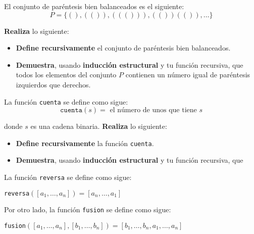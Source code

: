 \documentclass[oneside]{style}
\begin{document}
\begin{questions}[label=\protect\circled{\bfseries\arabic*}]
    \question
    {
        El conjunto de paréntesis bien balanceados es el siguiente:
        \begin{equation*}
            P = \{(), (()), ((())), (())(()), \ldots\}
        \end{equation*}

        \textbf{Realiza} lo siguiente:
        \begin{itemize}
            \item \textbf{Define recursivamente} el conjunto de paréntesis bien 
            balanceados. 

            \item \textbf{Demuestra}, usando \textbf{inducción estructural} y 
            tu función recursiva, que todos los elementos del conjunto $P$ 
            contienen un número igual de paréntesis izquierdos que derechos. 
        \end{itemize}
    }

    \question
    {
        La función \texttt{cuenta} se define como sigue:
        \begin{equation*}
            \texttt{cuenta}(s) = \text{ el número de unos que tiene } s
        \end{equation*}

        donde $s$ es una cadena binaria. \textbf{Realiza} lo siguiente:
        \begin{itemize}
            \item \textbf{Define recursivamente} la función \texttt{cuenta}.
            \item \textbf{Demuestra}, usando \textbf{inducción estructural} y 
            tu función recursiva, que 
            \begin{center}
            \end{center}
        \end{itemize}
    }

    \newpage
    \question
    {
        La función \texttt{reversa} se define como sigue:
        \begin{center}
            \texttt{reversa}$([a_1, \ldots, a_n]) = [a_n, \ldots, a_1]$ 
        \end{center}

        Por otro lado, la función \texttt{fusion} se define como sigue: 
        \begin{center}
            \texttt{fusion}$([a_1, \ldots, a_n], [b_1, \ldots, b_n]) 
            = [b_1, \ldots, b_n, a_1, \ldots, a_n]$ 
        \end{center}

}
\end{questions}
\end{document}
